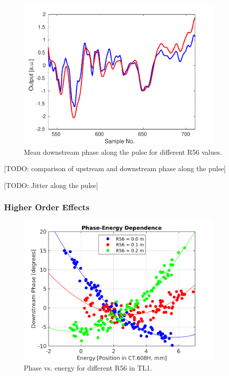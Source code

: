 \begin{figure}
  \centering
  \includegraphics[width=0.9\textwidth]{Figures/propagation/r56Scan_comparisonPhaseEnergy}
  \caption{Mean downstream phase along the pulse for different R56 values.}
  \label{f:r56Scan_comparisonPhaseEnergy}
\end{figure}

[TODO: comparison of upstream and downstream phase along the pulse]

[TODO: Jitter along the pulse]

\subsubsection{Higher Order Effects}

\begin{figure}
  \centering
  \includegraphics[width=0.9\textwidth]{Figures/propagation/R56ScanGunWiggle_Vs608}
  \caption{Phase vs. energy for different R56 in TL1.}
  \label{f:R56ScanGunWiggle_Vs608}
\end{figure}

